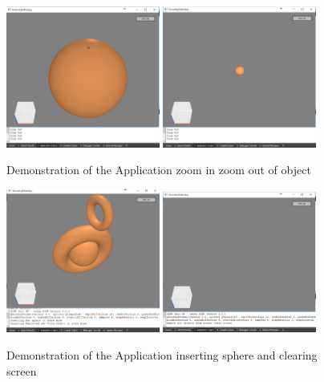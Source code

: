 \documentclass[a4,10pt]{article}
\begin{document}
\begin{figure}[]
\centering
\includegraphics[width=0.45\textwidth]{gfx/zoom.png}
\includegraphics[width=0.45\textwidth]{gfx/zoomout.png}
\caption{Demonstration of the Application zoom in zoom out of object}
\label{fig:zoom}
\centering
\includegraphics[width=0.45\textwidth]{gfx/insertsphere.png}
\includegraphics[width=0.45\textwidth]{gfx/clearscreen.png}
\caption{Demonstration of the Application inserting sphere and clearing screen}
\end{figure}
\end{document}
